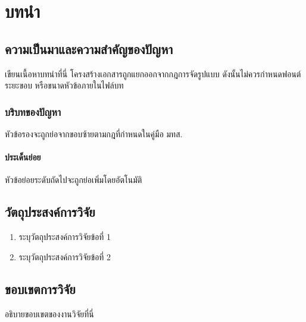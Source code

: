 \chapter{บทนำ}

\section{ความเป็นมาและความสำคัญของปัญหา}

เขียนเนื้อหาบทนำที่นี่ โครงสร้างเอกสารถูกแยกออกจากกฎการจัดรูปแบบ ดังนั้นไม่ควรกำหนดฟอนต์ ระยะขอบ หรือขนาดหัวข้อภายในไฟล์บท

\subsection{บริบทของปัญหา}

หัวข้อรองจะถูกย่อจากขอบซ้ายตามกฎที่กำหนดในคู่มือ มทส.

\subsubsection{ประเด็นย่อย}

หัวข้อย่อยระดับถัดไปจะถูกย่อเพิ่มโดยอัตโนมัติ

\section{วัตถุประสงค์การวิจัย}

\begin{enumerate}[label=\arabic*)]
  \item ระบุวัตถุประสงค์การวิจัยข้อที่ 1
  \item ระบุวัตถุประสงค์การวิจัยข้อที่ 2
\end{enumerate}

\section{ขอบเขตการวิจัย}

อธิบายขอบเขตของงานวิจัยที่นี่
